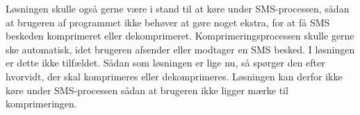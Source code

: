 Løsningen skulle også gerne være i stand til at køre under SMS-processen, sådan at brugeren af programmet ikke behøver at gøre noget ekstra, for at få SMS beskeden komprimeret eller dekomprimeret. Komprimeringsprocessen skulle gerne ske automatisk, idet brugeren afsender eller modtager en SMS besked. I løsningen er dette ikke tilfældet. Sådan som løsningen er lige nu, så spørger den efter hvorvidt, der skal komprimeres eller dekomprimeres. Løsningen kan derfor ikke køre under SMS-processen sådan at brugeren ikke ligger mærke til komprimeringen.